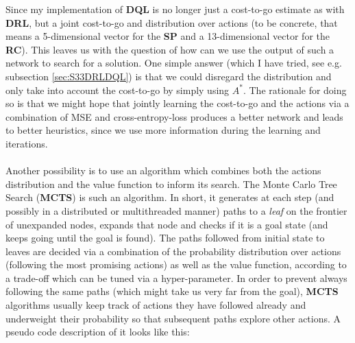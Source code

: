 Since my implementation of \textbf{DQL} is no longer just a cost-to-go estimate as with \textbf{DRL}, but a joint cost-to-go and distribution over actions (to be concrete, that means a 5-dimensional vector for the \textbf{SP} and a 13-dimensional vector for the \textbf{RC}). This leaves us with the question of how can we use the output of such a network to search for a solution. One simple answer (which I have tried, see e.g. subsection \ref{sec:S33DRLDQL}) is that we could disregard the distribution and only take into account the cost-to-go by simply using $A^{*}$. The rationale for doing so is that we might hope that jointly learning the cost-to-go and the actions via a combination of MSE and cross-entropy-loss produces a better network and leads to better heuristics, since we use more information during the learning and iterations.
\\
\\
Another possibility is to use an algorithm which combines both the actions distribution and the value function to inform its search. The Monte Carlo Tree Search (\textbf{MCTS}) is such an algorithm. In short, it generates at each step (and possibly in a distributed or multithreaded manner) paths to a \textit{leaf} on the frontier of unexpanded nodes, expands that node and checks if it is a goal state (and keeps going until the goal is found). The paths followed from initial state to leaves are decided via a combination of the probability distribution over actions (following the most promising actions) as well as the value function, according to a trade-off which can be tuned via a hyper-parameter. In order to prevent always following the same paths (which might take us very far from the goal), \textbf{MCTS} algorithms usually keep track of actions they have followed already and underweight their probability so that subsequent paths explore other actions. A pseudo code description of it looks like this:
\\
\teal
